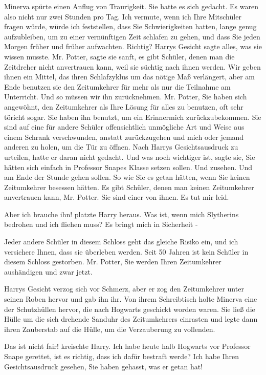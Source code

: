 Minerva spürte einen Anflug von Traurigkeit. Sie hatte es sich gedacht. \glqq{}Es
waren also nicht nur zwei Stunden pro Tag. Ich vermute, wenn ich Ihre Mitschüler
fragen würde, würde ich feststellen, dass Sie Schwierigkeiten hatten, lange
genug aufzubleiben, um zu einer vernünftigen Zeit schlafen zu gehen, und dass
Sie jeden Morgen früher und früher aufwachten. Richtig?\grqq{} Harrys Gesicht
sagte alles, was sie wissen musste. \glqq{}Mr. Potter\grqq{}, sagte sie sanft,
\glqq{}es gibt Schüler, denen man die Zeitdreher nicht anvertrauen kann, weil sie
süchtig nach ihnen werden. Wir geben ihnen ein Mittel, das ihren Schlafzyklus um
das nötige Maß verlängert, aber am Ende benutzen sie den Zeitumkehrer für mehr
als nur die Teilnahme am Unterricht. Und so müssen wir ihn zurücknehmen. Mr.
Potter, Sie haben sich angewöhnt, den Zeitumkehrer als Ihre Lösung für alles zu
benutzen, oft sehr töricht sogar. Sie haben ihn benutzt, um ein Erinnermich
zurückzubekommen. Sie sind auf eine für andere Schüler offensichtlich unmögliche
Art und Weise aus einem Schrank verschwunden, anstatt zurückzugehen und mich
oder jemand anderen zu holen, um die Tür zu öffnen.\grqq{} Nach Harrys
Gesichtsausdruck zu urteilen, hatte er daran nicht gedacht. \glqq{}Und was noch
wichtiger ist\grqq{}, sagte sie, \glqq{}Sie hätten sich einfach in Professor
Snapes Klasse setzen sollen. Und zusehen. Und am Ende der Stunde gehen sollen.
So wie Sie es getan hätten, wenn Sie keinen Zeitumkehrer besessen hätten. Es
gibt Schüler, denen man keinen Zeitumkehrer anvertrauen kann, Mr. Potter. Sie
sind einer von ihnen. Es tut mir leid.\grqq{}

\glqq{}Aber ich brauche ihn!\grqq{} platzte Harry heraus. \glqq{}Was ist, wenn
mich Slytherins bedrohen und ich fliehen muss? Es bringt mich in Sicherheit
-\grqq{}

\glqq{}Jeder andere Schüler in diesem Schloss geht das gleiche Risiko ein, und
ich versichere Ihnen, dass sie überleben werden. Seit 50 Jahren ist kein Schüler
in diesem Schloss gestorben. Mr. Potter, Sie werden Ihren Zeitumkehrer
aushändigen und zwar jetzt.\grqq{}

Harrys Gesicht verzog sich vor Schmerz, aber er zog den Zeitumkehrer unter
seinen Roben hervor und gab ihn ihr. Von ihrem Schreibtisch holte Minerva eine
der Schutzhüllen hervor, die nach Hogwarts geschickt worden waren. Sie ließ die
Hülle um die sich drehende Sanduhr des Zeitumkehrers einrasten und legte dann
ihren Zauberstab auf die Hülle, um die Verzauberung zu vollenden.

\glqq{}Das ist nicht fair!\grqq{} kreischte Harry. \glqq{}Ich habe heute halb
Hogwarts vor Professor Snape gerettet, ist es richtig, dass ich dafür bestraft
werde? Ich habe Ihren Gesichtsausdruck gesehen, Sie haben gehasst, was er getan
hat!\grqq{}

